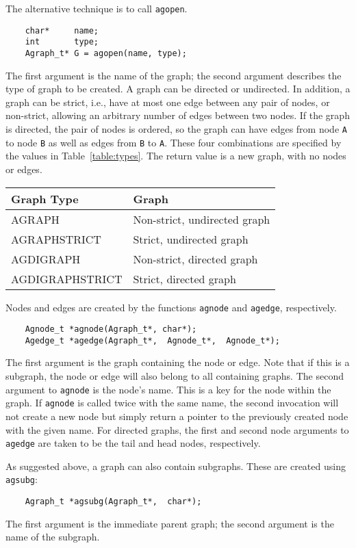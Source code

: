 The alternative technique is to call {\tt agopen}. 
\begin{verbatim}
    char*     name;
    int       type;
    Agraph_t* G = agopen(name, type);
\end{verbatim}
The first argument is
the name of the graph; the second argument describes the type of graph
to be created. A graph can be directed or undirected. In
addition, a graph can be strict, i.e., have at most one edge between
any pair of nodes, or non-strict, allowing an arbitrary number of edges
between two nodes. If the graph is directed, the pair of nodes is ordered,
so the graph can have edges from node {\tt A} to node {\tt B} as well
as edges from {\tt B} to {\tt A}. These four combinations are specified
by the values in Table~\ref{table:types}.
The return value is a new graph, with no nodes or edges.
\begin{table*}[h]
\centering
\begin{tabular}{|l|l|} \hline
Graph Type & Graph \\ \hline
AGRAPH & Non-strict, undirected graph \\
AGRAPHSTRICT & Strict, undirected graph \\
AGDIGRAPH & Non-strict, directed graph \\
AGDIGRAPHSTRICT & Strict, directed graph \\ \hline
\end{tabular}
\caption{Graph types}
\label{table:types}
\end{table*}

Nodes and edges are created by the functions {\tt agnode} and
{\tt agedge}, respectively.
\begin{verbatim}
    Agnode_t *agnode(Agraph_t*, char*);
    Agedge_t *agedge(Agraph_t*,  Agnode_t*,  Agnode_t*);
\end{verbatim}
The first argument is the graph containing the node or edge. Note
that if this is a subgraph, the node or edge will also belong to
all containing graphs. The second argument to {\tt agnode} is the
node's name. This is a key for the node within the graph. If
{\tt agnode} is called twice with the same name, the second invocation
will not create a new node but simply return a pointer to the previously
created node with the given name. For directed graphs, the first and
second node arguments to {\tt agedge} are taken to be the tail and head
nodes, respectively.

As suggested above, a graph can also contain subgraphs. These are
created using {\tt agsubg}:
\begin{verbatim}
    Agraph_t *agsubg(Agraph_t*,  char*);
\end{verbatim}
The first argument is the immediate parent graph; the second argument
is the name of the subgraph. 

